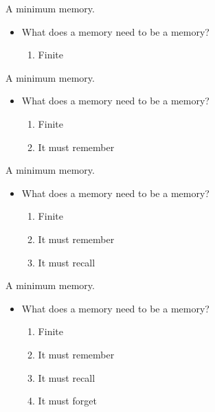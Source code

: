 \documentclass[10pt]{beamer}
\begin{document}
\begin{frame}[fragile]{A minimum memory.}
\begin{itemize}
    \item What does a memory need to be a memory?
    \begin{enumerate}
        \item Finite
    \end{enumerate}
\end{itemize}
\end{frame}

\begin{frame}[fragile]{A minimum memory.}
\begin{itemize}
    \item What does a memory need to be a memory?
    \begin{enumerate}
        \item Finite
        \item It must remember
    \end{enumerate}
\end{itemize}
\end{frame}

\begin{frame}[fragile]{A minimum memory.}
\begin{itemize}
    \item What does a memory need to be a memory?
    \begin{enumerate}
        \item Finite
        \item It must remember
        \item It must recall
    \end{enumerate}
\end{itemize}
\end{frame}

\begin{frame}[fragile]{A minimum memory.}
\begin{itemize}
    \item What does a memory need to be a memory?
    \begin{enumerate}
        \item Finite
        \item It must remember
        \item It must recall
        \item It must forget
    \end{enumerate}
\end{itemize}
\end{frame}
\end{document}
